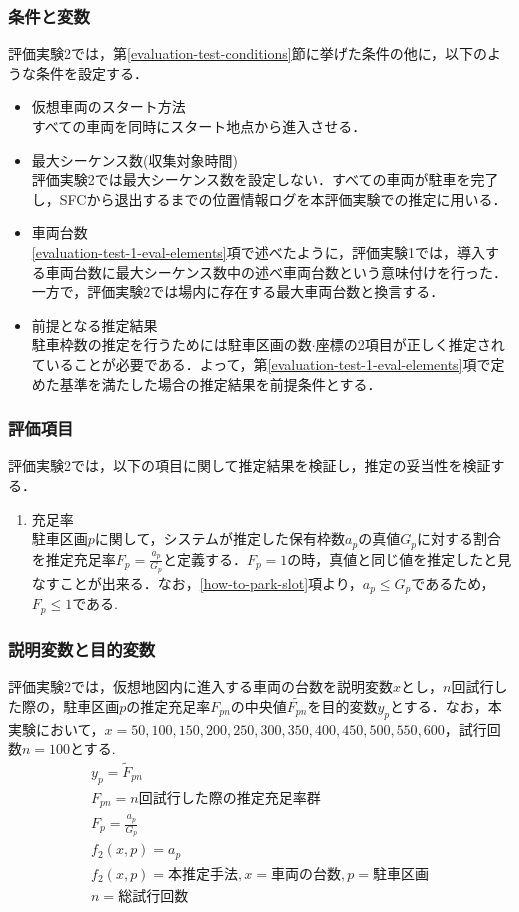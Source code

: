 \subsubsection{条件と変数}
評価実験2では，第\ref{evaluation-test-conditions}節に挙げた条件の他に，以下のような条件を設定する．
\begin{itemize}
	\item 仮想車両のスタート方法\\
	      すべての車両を同時にスタート地点から進入させる．
	\item 最大シーケンス数(収集対象時間) \\
	      評価実験2では最大シーケンス数を設定しない．すべての車両が駐車を完了し，SFCから退出するまでの位置情報ログを本評価実験での推定に用いる．
	\item 車両台数 \\
	      \ref{evaluation-test-1-eval-elements}項で述べたように，評価実験1では，導入する車両台数に最大シーケンス数中の述べ車両台数という意味付けを行った．一方で，評価実験2では場内に存在する最大車両台数と換言する．
	\item 前提となる推定結果 \\
	      駐車枠数の推定を行うためには駐車区画の数$\cdot$座標の2項目が正しく推定されていることが必要である．よって，第\ref{evaluation-test-1-eval-elements}項で定めた基準を満たした場合の推定結果を前提条件とする．
\end{itemize}
\subsubsection{評価項目}
評価実験2では，以下の項目に関して推定結果を検証し，推定の妥当性を検証する．
\begin{enumerate}
	\item 充足率 \\
	      駐車区画$p$に関して，システムが推定した保有枠数$a_p$の真値$G_p$に対する割合を推定充足率$F_p = \frac{a_p}{G_p}$と定義する．$F_p = 1$の時，真値と同じ値を推定したと見なすことが出来る．なお，\ref{how-to-park-slot}項より，$a_p \leq G_p$であるため，$F_p \leq 1 $である.
\end{enumerate}


\subsubsection{説明変数と目的変数}
評価実験2では，仮想地図内に進入する車両の台数を説明変数$x$とし，$n$回試行した際の，駐車区画$p$の推定充足率$F_{pn}$の中央値$\tilde{F_{pn}}$を目的変数$y_p$とする．なお，本実験において，$x = 50,100,150,200,250,300,350,400,450,500,550,600$，試行回数$n=100$とする.
\begin{align}
	y_p = \tilde{F}_{pn}                                   \\
	F_{pn} = n回試行した際の推定充足率群      \\
	F_p = \frac{a_p}{G_p}                                  \\
	f_{2}(x,p) = a_p \\
	f_{2}(x,p) = 本推定手法, x = 車両の台数,p = 駐車区画\\
	n = 総試行回数                                    
\end{align}
